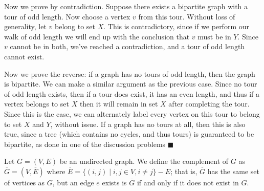 \documentclass[11pt]{article}
\begin{document}
\begin{Parts}
\begin{solution}
    Now we prove by contradiction. Suppose there exists a bipartite graph with a tour of odd length. Now choose a vertex $v$ from this tour. Without loss of generality, let $v$ belong to set $X$. This is contradictory, since if we perform our walk of odd length we will end up with the conclusion that $v$ must be in $Y$. Since $v$ cannot be in both, we've reached a contradiction, and a tour of odd length cannot exist.

    Now we prove the reverse: if a graph has no tours of odd length, then the graph is bipartite. We can make a similar argument as the previous case. Since no tour of odd length exists, then if a tour does exist, it has an even length, and thus if a vertex belongs to set $X$ then it will remain in set $X$ after completing the tour. Since this is the case, we can alternately label every vertex on this tour to belong to set $X$ and $Y$, without issue. If a graph has no tours at all, then this is also true, since a tree (which contains no cycles, and thus tours) is guaranteed to be bipartite, as done in one of the discussion problems $\blacksquare$
\end{solution}
\end{Parts}
\pagebreak
{}

Let $G = (V, E)$ be an undirected graph.  We define the complement of $G$ as $\overline{G} = (V, \overline{E})$ where $\overline{E} = \{(i,j) \mid i,j \in V, i \neq j\} - E$; that is, $\overline{G}$ has the same set of vertices as $G$, but an edge $e$ exists is $\overline{G}$ if and only if it does not exist in $G$.
\end{document}
